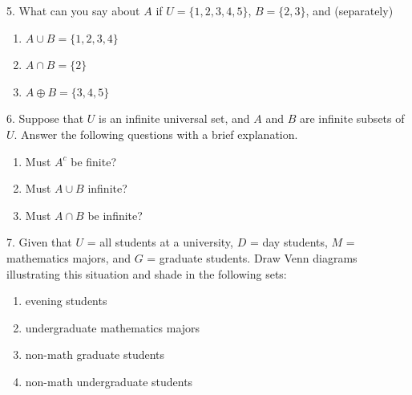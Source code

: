 \documentclass[10pt,]{book}
\theoremstyle{plain}
\theoremstyle{definition}
\begin{document}
\begin{exercisegroup}
\item[5.]\hypertarget{exercise-11}{}  What can you say about \(A\) if \(U = \{1, 2, 3, 4, 5\}\), \(B = \{2, 3\}\), and (separately) 
\leavevmode%
\begin{multicols}{1}
\begin{enumerate}[label=(\alph*)]
\item\hypertarget{li-94}{}  \(A \cup B = \{1, 2, 3,4\}\) \item\hypertarget{li-95}{}  \(A \cap  B = \{2\}\) \item\hypertarget{li-96}{}  \(A \oplus  B = \{3, 4, 5\}\)\end{enumerate}
\end{multicols}
\par\smallskip
\item[6.]\hypertarget{exercise-12}{} Suppose that \( U\) is an infinite universal set, and \( A\) and \( B\) are infinite subsets of \( U\). Answer the following questions with a brief explanation. 
\leavevmode%
\begin{multicols}{1}
\begin{enumerate}[label=(\alph*)]
\item\hypertarget{li-97}{}  Must \(A^c\) be finite? \item\hypertarget{li-98}{}  Must \(A\cup B\) infinite? \item\hypertarget{li-99}{}  Must \(A\cap B\) be infinite? \end{enumerate}
\end{multicols}
\par\smallskip
\item[7.]\hypertarget{exercise-13}{}  Given that \( U\) = all students at a university, \( D\) = day students, \( M\) = mathematics majors, and \( G\) = graduate
students. Draw Venn diagrams illustrating this situation and shade in the following sets: 
\leavevmode%
\begin{multicols}{1}
\begin{enumerate}[label=(\alph*)]
\item\hypertarget{li-100}{}  evening students \item\hypertarget{li-101}{}  undergraduate mathematics majors \item\hypertarget{li-102}{}  non-math graduate students \item\hypertarget{li-103}{}  non-math undergraduate students\end{enumerate}
\end{multicols}

\end{exercisegroup}
\end{document}
